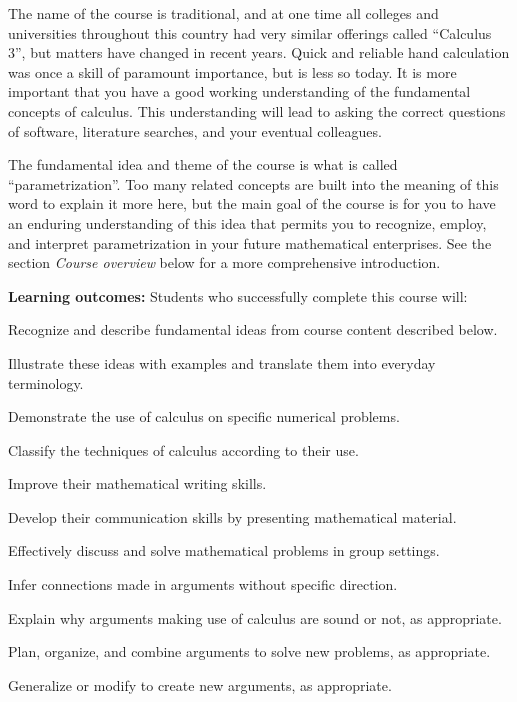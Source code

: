\documentclass[12pt,twoside]{amsart}
\begin{document}
The name of the course is traditional, and at one time all colleges and universities throughout this country had very similar offerings called ``Calculus 3'', but matters have changed in recent years. Quick and reliable hand calculation was once a skill of paramount importance, but is less so today. It is more important that you have a good working understanding of the fundamental concepts of calculus. This understanding will lead to asking the correct questions of software, literature searches, and your eventual colleagues.

The fundamental idea and theme of the course is what is called ``parametrization''. Too many related concepts are built into the meaning of this word to explain it more here, but the main goal of the course is for you to have an enduring understanding of this idea that permits you to recognize, employ, and interpret parametrization in your future mathematical enterprises. See the section \emph{Course overview} below for a more comprehensive introduction.

\textbf{Learning outcomes:} Students who successfully complete this course will:
\begin{compactitem}
    \item Recognize and describe fundamental ideas from course content described below.
    \item Illustrate these ideas with examples and translate them into everyday terminology.
    \item Demonstrate the use of calculus on specific numerical problems.
    \item Classify the techniques of calculus according to their use.
    \item Improve their mathematical writing skills.
    \item Develop their communication skills by presenting mathematical material.
    \item Effectively discuss and solve mathematical problems in group settings.
    \item Infer connections made in arguments without specific direction.
    \item Explain why arguments making use of calculus are sound or not, as appropriate.
    \item Plan, organize, and combine arguments to solve new problems, as appropriate.
    \item Generalize or modify to create new arguments, as appropriate.
\end{compactitem}
\end{document}
